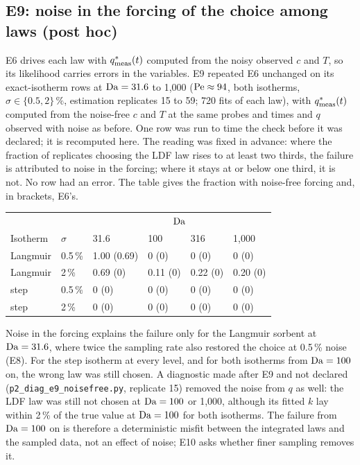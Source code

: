 \subsection*{E9: noise in the forcing of the choice among laws (post hoc)}
E6 drives each law with $q^{*}_{\mathrm{meas}}(t)$ computed from the noisy observed $c$ and $T$, so its likelihood
carries errors in the variables. E9 repeated E6 unchanged on its exact-isotherm rows at
$\mathrm{Da} = 31.6$ to 1,000 ($\mathrm{Pe} \approx 94$, both isotherms, $\sigma \in \{0.5, 2\}\,\%$, estimation
replicates 15 to 59; 720 fits of each law), with $q^{*}_{\mathrm{meas}}(t)$ computed from the noise-free $c$ and $T$
at the same probes and times and $q$ observed with noise as before. One row was run to time the
check before it was declared; it is recomputed here. The reading was fixed in advance: where the
fraction of replicates choosing the LDF law rises to at least two thirds, the failure is
attributed to noise in the forcing; where it stays at or below one third, it is not. No row had an
error. The table gives the fraction with noise-free forcing and, in brackets, E6's.
\begin{center}
\small
\begin{tabular}{@{}llllll@{}}
\toprule
& & \multicolumn{4}{c}{$\mathrm{Da}$} \\
Isotherm & $\sigma$ & 31.6 & 100 & 316 & 1,000 \\
\midrule
Langmuir & 0.5\,\% & 1.00 (0.69) & 0 (0) & 0 (0) & 0 (0) \\
Langmuir & 2\,\% & 0.69 (0) & 0.11 (0) & 0.22 (0) & 0.20 (0) \\
step & 0.5\,\% & 0 (0) & 0 (0) & 0 (0) & 0 (0) \\
step & 2\,\% & 0 (0) & 0 (0) & 0 (0) & 0 (0) \\
\bottomrule
\end{tabular}
\end{center}
Noise in the forcing explains the failure only for the Langmuir sorbent at $\mathrm{Da} = 31.6$, where
twice the sampling rate also restored the choice at 0.5\,\% noise (E8). For the step isotherm at
every level, and for both isotherms from $\mathrm{Da} = 100$ on, the wrong law was still chosen. A
diagnostic made after E9 and not declared (\texttt{p2\_diag\_e9\_noisefree.py}, replicate 15) removed
the noise from $q$ as well: the LDF law was still not chosen at $\mathrm{Da} = 100$ or 1,000, although its
fitted $k$ lay within 2\,\% of the true value at $\mathrm{Da} = 100$ for both isotherms. The failure from
$\mathrm{Da} = 100$ on is therefore a deterministic misfit between the integrated laws and the sampled data, not an effect
of noise; E10 asks whether finer sampling removes it.

